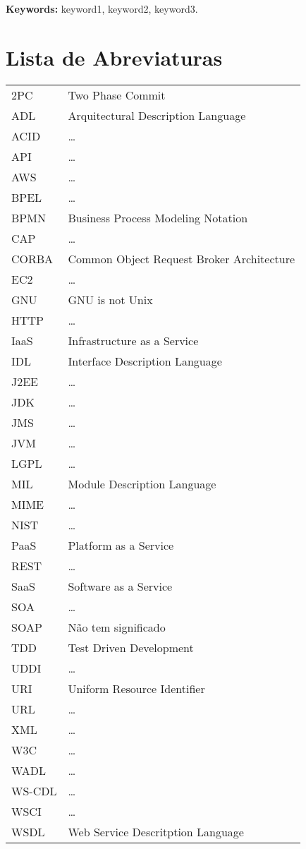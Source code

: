 \documentclass[11pt,twoside,a4paper]{book}
\begin{document}
\noindent \textbf{Keywords:} keyword1, keyword2, keyword3.

\tableofcontents    %

\chapter{Lista de Abreviaturas}
\begin{tabular}{ll}
         2PC & Two Phase Commit \\
         ADL & Arquitectural Description Language \\
         ACID & \dots \\
         API & \dots \\
         AWS & \dots \\
         BPEL & \dots \\
         BPMN & Business Process Modeling Notation \\
         CAP & \dots \\
         CORBA & Common Object Request Broker Architecture \\
         EC2 & \dots \\
         GNU & GNU is not Unix \\
         HTTP & \dots \\
         IaaS & Infrastructure as a Service \\
         IDL & Interface Description Language \\ 
         J2EE & \dots \\
         JDK & \dots \\
         JMS & \dots \\
         JVM & \dots \\
         LGPL & \dots \\
         MIL & Module Description Language \\
         MIME & \dots \\
         NIST & \dots \\
         PaaS & Platform as a Service \\
         REST & \dots \\
         SaaS & Software as a Service \\
         SOA & \dots \\
         SOAP & Não tem significado \\
         TDD & Test Driven Development \\
         UDDI & \dots \\
         URI & Uniform Resource Identifier \\
         URL & \dots \\
         XML & \dots \\
         W3C & \dots \\
         WADL & \dots \\
         WS-CDL & \dots \\
         WSCI & \dots \\
         WSDL & Web Service Descritption Language \\
\end{tabular}
\end{document}
